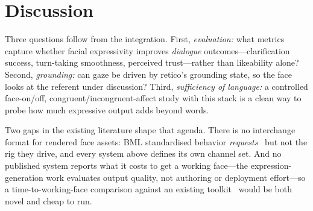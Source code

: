 \documentclass[conference]{IEEEtran}
\begin{document}
\section{Discussion}

Three questions follow from the integration. First, \emph{evaluation:} what
metrics capture whether facial expressivity improves \emph{dialogue}
outcomes---clarification success, turn-taking smoothness, perceived
trust---rather than likeability alone? Second, \emph{grounding:} can gaze be
driven by retico's grounding state, so the face looks at the referent under
discussion? Third, \emph{sufficiency of language:} a controlled face-on/off,
congruent/incongruent-affect study with this stack is a clean way to probe
how much expressive output adds beyond words.

Two gaps in the existing literature shape that agenda. There is no
interchange format for rendered face assets: BML standardised behavior
\emph{requests}~\cite{kopp2006bml} but not the rig they drive, and every
system above defines its own channel set. And no published system reports
what it costs to get a working face---the expression-generation work
evaluates output quality, not authoring or deployment effort---so a
time-to-working-face comparison against an existing
toolkit~\cite{alvesoliveira2022flexsdk} would be both novel and cheap to run.
\end{document}
